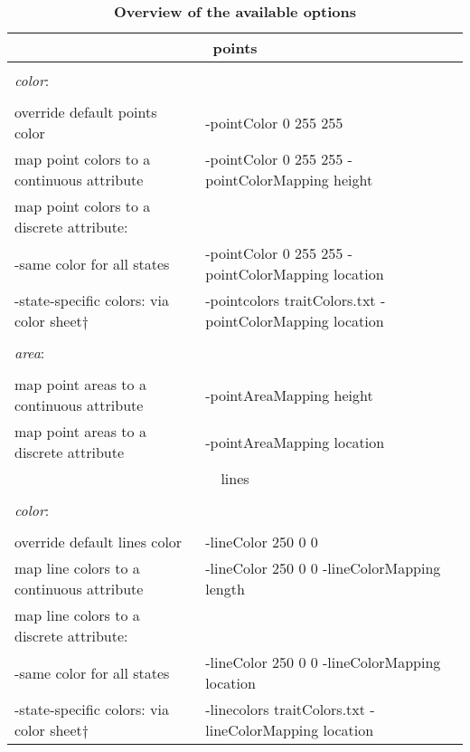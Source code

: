 \documentclass[english]{paper}
\begin{document}
\vspace{0.5cm}
\begin{table}[!ht]
\centering
\caption[Overview of the available options]{\footnotesize{\textbf{Overview of the available options}}}
\begin{tabular}{ll}
\\
\toprule
			\multicolumn{2}{c}{points}			\\
\midrule	
								&						\\
\textit{color}:					&						\\
								&						\\
override default points color			& -pointColor 0 255 255										\\
map point colors to a continuous attribute 	& -pointColor 0 255 255 -pointColorMapping height					\\
map point colors to a discrete attribute:	& 					 									\\
	-same color for all states			&-pointColor 0 255 255 -pointColorMapping location					\\
	-state-specific colors: via color sheet$\dagger$&-pointcolors traitColors.txt -pointColorMapping location		\\
								&						\\
\textit{area}: 					&						\\
								&						\\
map point areas to a continuous attribute	& -pointAreaMapping height									\\
map point areas to a discrete attribute	& -pointAreaMapping location									\\
\midrule
			\multicolumn{2}{c}{lines}			\\
\midrule
								&						\\
\textit{color}:					&						\\
								&						\\
override default lines color				&	-lineColor 250 0 0		\\
map line colors to a continuous attribute	&	-lineColor 250 0 0 -lineColorMapping length				\\
map line colors to a discrete attribute:	&						\\
	-same color for all states			&	-lineColor 250 0 0 -lineColorMapping location				\\
	-state-specific colors: via color sheet$\dagger$&-linecolors traitColors.txt -lineColorMapping location		\\

\end{tabular}
\end{table}
\end{document}
